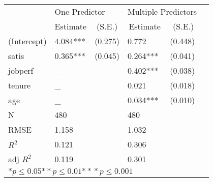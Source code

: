 \begin{tabular}{@{}l*{5}{l}@{}}
\hline
  &\multicolumn{2}{l}{One Predictor  } &\multicolumn{2}{l}{Multiple Predictors  }\tabularnewline
 &\multicolumn{1}{c}{Estimate}&\multicolumn{1}{c}{(S.E.)}&\multicolumn{1}{c}{Estimate}&\multicolumn{1}{c}{(S.E.)}\tabularnewline
 \hline
 \hline
  (Intercept) & 4.084*** & (0.275) & 0.772 & (0.448) \tabularnewline
  satis & 0.365*** & (0.045) & 0.264*** & (0.041) \tabularnewline
  jobperf &\multicolumn{1}{l}{\_ }&& 0.402*** & (0.038) \tabularnewline
  tenure &\multicolumn{1}{l}{\_ }&& 0.021 & (0.018) \tabularnewline
  age &\multicolumn{1}{l}{\_ }&& 0.034*** & (0.010) \tabularnewline
 \hline
 N&\multicolumn{1}{l}{480}  &&\multicolumn{1}{l}{480}  & \tabularnewline
 RMSE&1.158&&1.032\tabularnewline
 $R^2$&0.121&&0.306\tabularnewline
 adj $R^2$&0.119&&0.301\tabularnewline
 \hline
\hline
 
 \multicolumn{5}{l}{  ${*  p}\le 0.05$${*\!\!*  p}\le 0.01$${*\!\!*\!\!*  p}\le 0.001$}\tabularnewline
 \end{tabular}